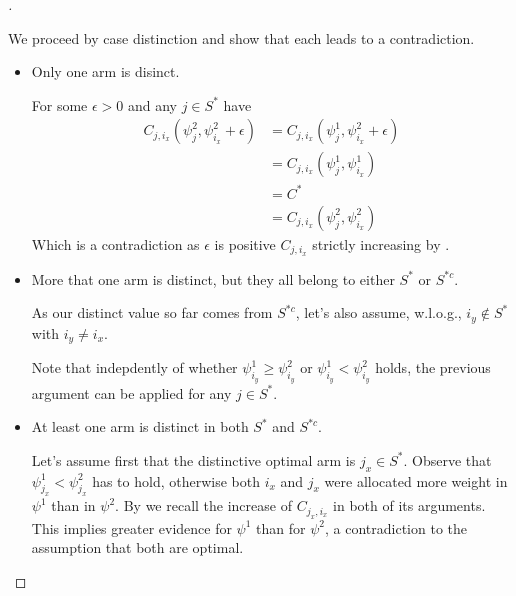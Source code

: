 \begin{proof}[]
\begin{enumerate}[(i)]
    We proceed by case distinction and show that each leads to a contradiction.
    \begin{itemize}
      \item Only one arm is disinct.

      For some $\epsilon > 0$ and any $j \in S^*$ have
      \begin{align}
        C_{j, i_x}(\psi^2_j, \psi^2_{i_x} + \epsilon) &= C_{j, i_x}(\psi^1_j, \psi^2_{i_x} + \epsilon) \\
        &= C_{j, i_x}(\psi^1_j, \psi^1_{i_x}) \\
        &= C^* \\
        &= C_{j, i_x}(\psi^2_j, \psi^2_{i_x})
      \end{align}
      Which is a contradiction as $\epsilon$ is positive $C_{j, i_x}$ strictly increasing by .
      \item More that one arm is distinct, but they all belong to either $S^*$ or $S^{*c}$.

      As our distinct value so far comes from $S^{*c}$, let's also assume, w.l.o.g., $i_y \notin S^*$ with $i_y \neq i_x$.

      Note that indepdently of whether $\psi^1_{i_y} \geq \psi^2_{i_y}$ or $\psi^1_{i_y} < \psi^2_{i_y}$ holds, the previous argument can be applied for any $j \in S^*$.

      \item At least one arm is distinct in both $S^*$ and $S^{*c}$.

      Let's assume first that the distinctive optimal arm is $j_x \in S^*$. Observe that $\psi^1_{j_x} < \psi^2_{j_x}$ has to hold, otherwise both $i_x$ and $j_x$ were allocated more weight in $\psi^1$ than in $\psi^2$. By  we recall the increase of $C_{j_x, i_x}$ in both of its arguments. This implies greater evidence for $\psi^1$ than for $\psi^2$, a contradiction to the assumption that both are optimal.


\end{itemize}
\end{enumerate}
\end{proof}
